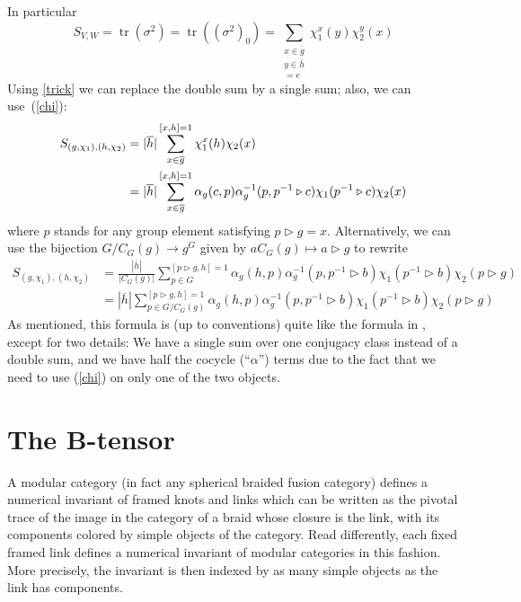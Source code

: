\documentclass[11pt]{book}
\theoremstyle{Rem}
\theoremstyle{definition}
\numberwithin{equation}{section}
\newcommand\tr{\operatorname{tr}}
\newcommand\hit{\triangleright}
\newcommand\inv{^{-1}}
\newcommand{\gb}{\overline{g}}
\newcommand{\hb}{\overline{h}}
\begin{document}
In particular
\begin{equation*}
  S_{V,W}=\tr(\sigma^2)=\tr((\sigma^2)_0)=\sum_{\substack{x\in \overline g\\y\in\overline h\\ [x,y]=e}}\chi_1^x(y)\chi_2^y(x)
\end{equation*}
Using \cref{trick} we can replace the double sum by a single sum; also, we can use~(\cref{chi}):
\begin{align*}
S_{(g, \chi_1),(h, \chi_2)} &= |\hb|\sum_{x \in \gb}^{[x,h]=1} \chi_1^x (h) \chi_2 (x)\notag\\
&=|\hb| \sum_{x \in \gb}^{[x,h]=1} \alpha_{g}(c, p) \alpha_{g}\inv(p, p\inv\hit c)\chi_1(p\inv\hit c) \chi_2 (x)
\end{align*} 
where $p$ stands for any group element satisfying $p\hit g=x$. Alternatively, we can use the bijection $G/C_G(g) \rightarrow g^G$ given by $aC_G(g)\mapsto a\hit g $ to rewrite
\begin{align*}\label{Sgroup}
  S_{(g, \chi_1),(h, \chi_2)} &=\frac{|\hb|}{|C_G(g)|}\sum^{[p\hit g,h]=1}_{p\in G} \alpha_{g}(h, p) \alpha^{-1}_{g}(p, p^{-1}\hit b)\chi_1(p^{-1}\hit b) \chi_2 (p\hit g)\\
  &={|\hb|}\sum^{[p\hit g,h]=1}_{p\in G/C_G(g)} \alpha_{g}(h, p) \alpha^{-1}_{g}(p, p^{-1}\hit b)\chi_1(p^{-1}\hit b) \chi_2 (p\hit g)
\end{align*}
As mentioned, this formula is (up to conventions) quite like the formula in \cite{Coste2000FiniteGM}, except for two details: We have a single sum over one conjugacy class instead of a double sum, and we have half the cocycle (``$\alpha$'') terms due to the fact that we need to use (\cref{chi}) on only one of the two objects.

\section{The B-tensor}\label{sec:borromean-tensor}

A modular category (in fact any spherical braided fusion category) defines a numerical invariant of framed knots and links which can be written as the pivotal trace of the image in the category of a braid whose closure is the link, with its components colored by simple objects of the category. Read differently, each fixed framed link defines a numerical invariant of modular categories in this fashion. More precisely, the invariant is then indexed by as many simple objects as the link has components.
\end{document}
